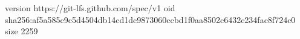 version https://git-lfs.github.com/spec/v1
oid sha256:af5a585c9c5d4504db14cd1dc9873060ccbd1f0aa8502c6432c234fac8f724c0
size 2259
